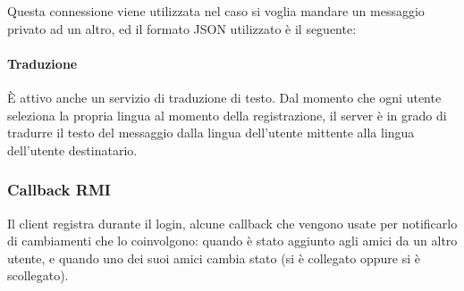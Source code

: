 Questa connessione viene utilizzata nel caso si voglia mandare un messaggio privato ad un altro, ed il formato JSON utilizzato è il seguente: \\
\cprotect[mm]

\paragraph{Traduzione}
È attivo anche un servizio di traduzione di testo. Dal momento che ogni utente seleziona la propria lingua al momento della registrazione, il server è in grado di tradurre il testo del messaggio dalla lingua dell'utente mittente alla lingua dell'utente destinatario.

\subsubsection{Callback RMI}
Il client registra durante il login, alcune callback che vengono usate per notificarlo di cambiamenti che lo coinvolgono: quando è stato aggiunto agli amici da un altro utente, e quando uno dei suoi amici cambia stato (si è collegato oppure si è scollegato).